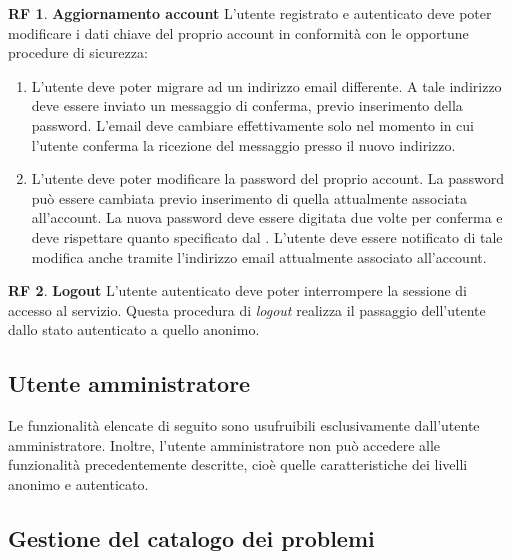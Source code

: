 \documentclass[11pt, a4paper]{article}
\theoremstyle{definition}
\newtheorem{funcreq}{RF} %
\begin{document}
\begin{funcreq}
\label{updateaccount}
\textbf{Aggiornamento account }
L'utente registrato e autenticato deve poter modificare i dati chiave del
proprio account in conformità con le opportune procedure di sicurezza:
\begin{enumerate}
\item L'utente deve poter migrare ad un indirizzo email differente. A tale
indirizzo deve essere inviato un messaggio di conferma, previo inserimento
della password. L'email
deve cambiare effettivamente solo nel momento in cui l'utente conferma la
ricezione del messaggio presso il nuovo indirizzo.

\item L'utente deve poter modificare la password del proprio account.
La password può essere cambiata previo inserimento di quella attualmente
associata all'account. La nuova password deve essere digitata due volte
per conferma e deve rispettare quanto specificato dal
\textcolor{blue}{}. 
L'utente deve essere notificato di tale modifica anche tramite
l'indirizzo email attualmente associato all'account.
\end{enumerate}
\end{funcreq}
    
\begin{funcreq}
\label{logout}
\textbf{Logout }
L'utente autenticato deve poter interrompere la sessione di accesso
al servizio. Questa procedura di \textit{logout} realizza il passaggio dell'utente
dallo stato autenticato a quello anonimo.
\end{funcreq}

\begin{center}
    \section*{Utente amministratore}
\end{center}

Le funzionalità elencate di seguito sono usufruibili esclusivamente dall'utente
amministratore. Inoltre, l'utente amministratore non può accedere alle funzionalità
precedentemente descritte, cioè quelle caratteristiche dei livelli anonimo e autenticato.
\\
\subsection{Gestione del catalogo dei problemi}
\end{document}
